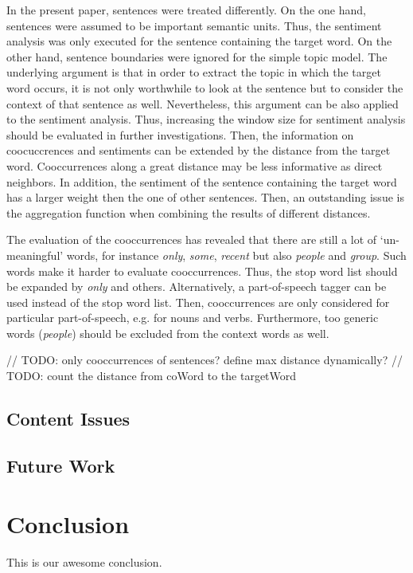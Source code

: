 \documentclass[10pt,a4paper,twocolumn]{scrartcl}
\begin{document}
In the present paper, sentences were treated differently. On the one hand, sentences were assumed to be important semantic units. Thus, the sentiment analysis was only executed for the sentence containing the target word. On the other hand, sentence boundaries were ignored for the simple topic model. The underlying argument is that in order to extract the topic in which the target word occurs, it is not only worthwhile to look at the sentence but to consider the context of that sentence as well. Nevertheless, this argument can be also applied to the sentiment analysis. Thus, increasing the window size for sentiment analysis should be evaluated in further investigations. Then, the information on coocuccrences and sentiments can be extended by the distance from the target word. Cooccurrences along a great distance may be less informative as direct neighbors. In addition, the sentiment of the sentence containing the target word has a larger weight then the one of other sentences. Then, an outstanding issue is the aggregation function when combining the results of different distances.

The evaluation of the cooccurrences has revealed that there are still a lot of `un-meaningful' words, for instance \textit{only}, \textit{some}, \textit{recent} but also \textit{people} and \textit{group}. Such words make it harder to evaluate cooccurrences. Thus, the stop word list should be expanded by \textit{only} and others. Alternatively, a part-of-speech tagger can be used instead of the stop word list. Then, cooccurrences are only considered for particular part-of-speech, e.g. for nouns and verbs. Furthermore, too generic words (\textit{people}) should be excluded from the context words as well. 


 
// TODO: only cooccurrences of sentences? define max distance dynamically?
// TODO: count the distance from coWord to the targetWord

\subsection{Content Issues}\label{subsex:contentIssues}




\subsection{Future Work}

\section{Conclusion}\label{sec:conclusion}
This is our awesome conclusion.
\end{document}
